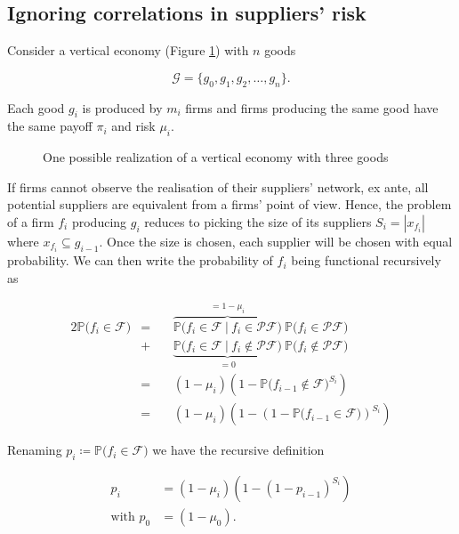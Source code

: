 \documentclass[american, abstract=on]{scrartcl}
\newcommand{\inputTikZ}[2]{%
      \scalebox{#1}{}  
    }
\newcommand{\F}{\mathcal{F}}
\newcommand{\G}{\mathcal{G}}
\newcommand{\PF}{\mathcal{P} \F}
\renewcommand{\P}{\mathbb{P}}
\newcommand{\abs}[1]{\left\lvert#1\right\rvert}
\begin{document}
\subsection{Ignoring correlations in suppliers' risk} \label{sec:vertical:ignoring}

Consider a vertical economy (Figure \ref{fig:vertical}) with $n$ goods

\begin{equation}
  \G = \{g_0, g_1, g_2, \ldots, g_n\}.
\end{equation}

Each good $g_i$ is produced by $m_i$ firms and firms producing the same good have the same payoff $\pi_i$ and risk $\mu_i$.

\begin{figure}[H]
  \centering
  \inputTikZ{0.7}{diagrams/vertical-economy.tikz} 
  \caption{One possible realization of a vertical economy with three goods}
  \label{fig:vertical}
\end{figure}

If firms cannot observe the realisation of their suppliers' network, ex ante, all potential suppliers are equivalent from a firms' point of view. Hence, the problem of a firm $f_i$ producing $g_i$ reduces to picking the size of its suppliers $S_i = \abs{x_{f_i}}$ where $x_{f_i} \subseteq g_{i - 1}$. Once the size is chosen, each supplier will be chosen with equal probability. We can then write the probability of $f_i$ being functional recursively as

\begin{alignat*}{2}
  \P\Big( f_i \in \F \Big) &= \ &&\overbrace{\P\Big( f_i \in \F \ \vert \ f_i \in \PF \Big)}^{= 1 - \mu_i} \ \P\Big( f_i \in \PF \Big) \\
  &+ &&\underbrace{\P\Big( f_i \in \F \ \vert \ f_i \notin \PF \Big)}_{= 0} \  \P\Big( f_i \notin \PF \Big) \\
  &= &&(1 - \mu_i) \left( 1 - \P\Big( f_{i-1} \notin \F \Big)^{S_i} \right) \\
  &= &&(1 - \mu_i) \left( 1 - \left(1 - \P\Big( f_{i-1} \in \F \Big)\right)^{S_i} \right)
\end{alignat*}

Renaming $p_i \coloneqq \P\Big( f_i \in \F \Big)$ we have the recursive definition

\begin{equation}
  \begin{split}
    p_{i} &= (1 - \mu_i) \left( 1 - (1 - p_{i-1})^{S_i} \right) \\
    \text{with } p_0 &= (1 - \mu_0).
  \end{split}
\end{equation}
\end{document}
